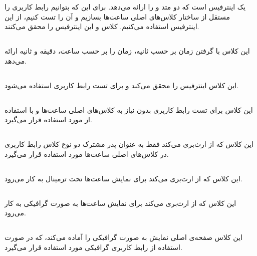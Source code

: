 \documentclass[oneside,a4paper,11pt]{report}
\begin{document}
	یک اینترفیس است که دو متد 
	و
	را ارائه می‌دهد. برای این که بتوانیم رابط کاربری را مستقل از ساختار کلاس‌های اصلی ساعت‌ها بسازیم و آن را تست کنیم، از این اینترفیس استفاده می‌کنیم.
	کلاس
	و
	این اینترفیس را محقق می‌کنند.
	
	\subsection{}
	
	این کلاس با گرفتن زمان بر حسب ثانیه، زمان را بر حسب ساعت، دقیقه و ثانیه ارائه می‌دهد.
	
	
	
	\subsection{}
	این کلاس اینترفیس 
	را محقق می‌کند و برای تست رابط کاربری استفاده می‌شود.
	
	\subsection{}
	این کلاس برای تست رابط کاربری بدون نیاز به کلاس‌های اصلی ساعت‌ها و با استفاده از 
	مورد استفاده قرار می‌گیرد.
	
	\subsection{}
	
	این کلاس که از 
	ارث‌بری می‌کند فقط به عنوان پدر مشترک دو نوع کلاس رابط کاربری در کلاس‌های اصلی ساعت‌ها مورد استفاده قرار می‌گیرد.
	
	\subsection{}
	
	این کلاس که از 
	ارث‌بری می‌کند برای نمایش ساعت‌ها تحت ترمینال به کار می‌رود.
	
	\subsection{}
	
	این کلاس که از 
	ارث‌بری می‌کند برای نمایش ساعت‌ها به صورت گرافیکی به کار می‌رود.
	
	\subsection{}
	این کلاس صفحه‌ی اصلی نمایش به صورت گرافیکی را آماده می‌کند، که در صورت استفاده از رابط کاربری گرافیکی مورد استفاده قرار می‌گیرد.
	
\end{document}
